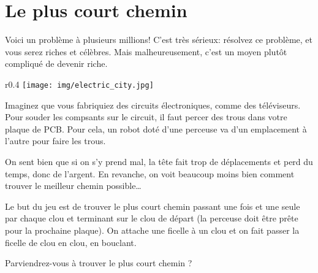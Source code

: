 \chapter*{Le plus court chemin}

Voici un problème à plusieurs millions! C'est très sérieux: résolvez ce
problème, et vous serez riches et célèbres. Mais malheureusement, c'est un moyen
plutôt compliqué de devenir riche.

\bigskip
\begin{wrapfigure}{r}{0.4\linewidth}
  \vspace{-\baselineskip}
  \texttt{[image: img/electric\_city.jpg]}
  \vspace{-2\baselineskip}
  \label{img:electric:city}
\end{wrapfigure}

Imaginez que vous fabriquiez des circuits électroniques, comme des téléviseurs.
Pour souder les compsants sur le circuit, il faut percer des trous dans votre
plaque de PCB. Pour cela, un robot doté d'une perceuse va d'un emplacement à
l'autre pour faire les trous.

\medskip
On sent bien que si on s'y prend mal, la tête fait trop de déplacements et perd
du temps, donc de l'argent. En revanche, on voit beaucoup moins bien comment
trouver le meilleur chemin possible\ldots


Le but du jeu est de trouver le plus court chemin passant une fois et une seule
par chaque clou et terminant sur le clou de départ (la perceuse doit être prête
pour la prochaine plaque). On attache une ficelle à un clou et on fait passer la
ficelle de clou en clou, en bouclant.

\bigskip
Parviendrez-vous à trouver le plus court chemin ?

\newpage

